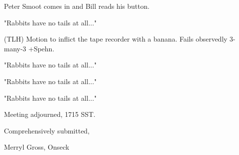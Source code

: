 \documentclass[12pt]{article}
\begin{document}
Peter Smoot comes in and Bill reads his button.

"Rabbits have no tails at all..."

(TLH) Motion to inflict the tape recorder with a banana. Fails observedly 3-many-3 +Spehn.

"Rabbits have no tails at all..."

"Rabbits have no tails at all..."

"Rabbits have no tails at all..."

\vspace{12pt}

\noindent
Meeting adjourned, 1715 SST.

\vspace{18pt}

\centerline{Comprehensively submitted,}
\centerline{Merryl Gross, Onseck}
\end{document}
